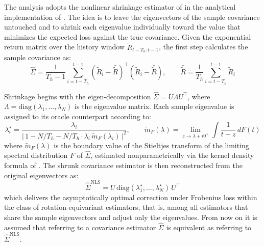 \documentclass[12pt]{article}
\begin{document}
The analysis adopts the nonlinear shrinkage estimator of \cite{ledoitwolf2012} in the analytical implementation of \cite{ledoitwolf2020}. The idea is to leave the eigenvectors of the sample covariance untouched and to shrink each eigenvalue individually toward the value that minimizes the expected loss against the true covariance. Given the exponential return matrix over the history window $\tilde{R}_{t-T_h:t-1}$, the first step calculates the sample covariance as:
\begin{equation}
\hat{\Sigma}
=
\frac{1}{T_h-1}
\sum_{i=t-T_h}^{t-1}
\left(\tilde{R}_i-\bar{\tilde{R}}\right)^{\top}
\left(\tilde{R}_i-\bar{\tilde{R}}\right),
\qquad
\bar{\tilde{R}}
=
\frac{1}{T_h}
\sum_{i=t-T_h}^{t-1} \tilde{R}_i
\label{eq:sample_cov}
\end{equation}

Shrinkage begins with the eigen-decomposition $\hat{\Sigma} = U\Lambda U^{\top}$, where $\Lambda = \mathrm{diag}(\lambda_1,\dots,\lambda_N)$ is the eigenvalue matrix. Each sample eigenvalue is assigned to its oracle counterpart according to:
\begin{equation}
  \lambda_i^{\star} = \frac{\lambda_i}{\bigl|\,1 - N/T_h - N/T_h \cdot \lambda_i\, \tilde{m}_F(\lambda_i)\,\bigr|^{2}},
  \qquad \tilde{m}_F(\lambda)=\lim_{z \to \lambda + i 0^{+}} \int \frac{1}{t - z}\, dF(t)
  \label{eq:nls}
\end{equation}
where $\tilde{m}_F(\lambda)$ is the boundary value of the Stieltjes transform of the limiting spectral distribution $F$ of $\hat{\Sigma}$, estimated nonparametrically via the kernel density formula of \cite{ledoitwolf2020}. The shrunk covariance estimator is then reconstructed from the original eigenvectors as:
\begin{equation}
  \hat{\Sigma}^{\text{NLS}} = U\,\mathrm{diag}(\lambda_1^{\star},\dots,\lambda_N^{\star})\,U^{\top}
  \label{eq:nls-cov}
\end{equation}
which delivers the asymptotically optimal correction under Frobenius loss within the class of rotation-equivariant estimators, that is, among all estimators that share the sample eigenvectors and adjust only the eigenvalues. From now on it is assumed that referring to a covariance estimator $\hat{\Sigma}$ is equivalent as referring to $\hat{\Sigma}^{\text{NLS}}$.
\end{document}
